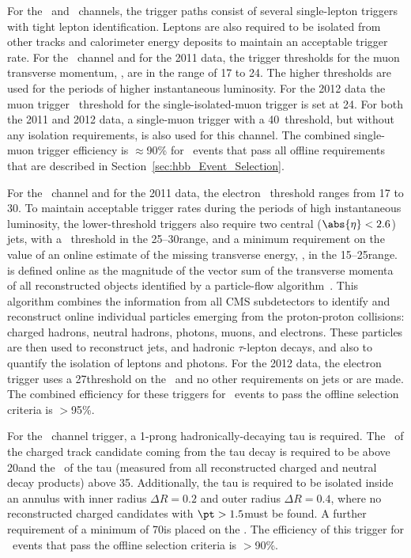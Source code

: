 \documentclass[12pt,twoside,a4paper,cmspaper,final,collab]{cms-tdr}
\begin{document}
For the \WmnH\ and  \WenH\ channels, the trigger paths consist of several single-lepton
triggers with tight lepton identification. Leptons are also required
to be isolated from other tracks and calorimeter energy deposits to maintain an acceptable trigger
rate. For the \WmnH\ channel and for the 2011 data, the trigger
thresholds for the muon transverse momentum, \pt, are in the range of 17 to 24\GeV. The higher
thresholds are used for the periods of higher instantaneous
luminosity. For the 2012 data the muon trigger \pt\ threshold for the single-isolated-muon trigger is
set at 24\GeV. For both the 2011 and 2012 data,
a single-muon trigger with a 40\GeV \pt\ threshold, but without any
isolation requirements, is also used for this channel.
The combined single-muon trigger efficiency is ${\approx}$90\% for
\WmnH\ events that pass all offline requirements that are described
in Section~\ref{sec:hbb_Event_Selection}.

For the \WenH\ channel and for the 2011 data, the electron \pt\ threshold ranges from 17 to 30\GeV.
To maintain acceptable trigger
rates during the periods of high instantaneous luminosity,
the lower-threshold triggers also require two central ($\abs{\eta}<2.6$) jets, with a \pt\
threshold in the 25--30\GeV range, and a minimum
requirement on the value of an online estimate of the missing transverse
energy, \MET, in the 15--25\GeV range. \MET is defined online as the magnitude of the vector sum of the transverse momenta
of all reconstructed objects identified by a
particle-flow algorithm~\cite{CMS-PAS-PFT-09-001,CMS-PAS-PFT-10-002}. This
algorithm combines the information
from all CMS subdetectors to identify and reconstruct online individual
particles emerging from the proton-proton collisions: charged hadrons, neutral hadrons,
photons, muons, and electrons.
These particles are then used to reconstruct jets, \MET and hadronic $\tau$-lepton decays,
and also to quantify the isolation of leptons and photons. For the
2012 data, the electron trigger uses a 27\GeV threshold on the \pt\ and no other
requirements on jets or \MET are made.
The combined efficiency for these triggers for \WenH\ events
to pass the offline selection criteria is $>$95\%.



For the \WtnH\ channel trigger, a 1-prong hadronically-decaying tau is required.
The \pt\ of the charged track candidate coming from the tau decay is required to be above 20\GeV and the \pt\
of the tau (measured from all reconstructed charged and neutral decay
products) above 35\GeV.
Additionally, the tau is required to be isolated inside
an annulus with inner radius $\Delta R = 0.2$ and outer
radius $\Delta R = 0.4$, where no reconstructed charged
candidates with $\pt > 1.5$\GeV must be found. A further requirement of a minimum of 70\GeV is placed on the \MET.
The efficiency of this trigger for \WtnH\ events that
pass the offline selection criteria is $>$90\%.
\end{document}
